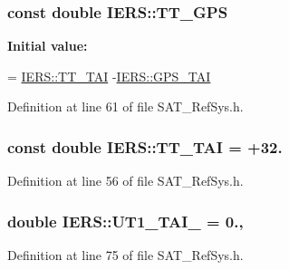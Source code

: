 \hypertarget{classIERS_aa3e35ab4212b649feeaf61764d85c690}{
\subsubsection[{T\-T\-\_\-\-G\-P\-S}]{\setlength{\rightskip}{0pt plus 5cm}const double I\-E\-R\-S\-::\-T\-T\-\_\-\-G\-P\-S\hspace{0.3cm}{\ttfamily [static]}}}\label{classIERS_aa3e35ab4212b649feeaf61764d85c690}
{\bfseries Initial value\-:}
\begin{DoxyCode}
=  \hyperlink{classIERS_ab6b095690199dc9789b668eafe93423e}{IERS::TT\_TAI}     
                             -\hyperlink{classIERS_a6289aefd6f6c45e58d7d9ce2e3789c64}{IERS::GPS\_TAI}
\end{DoxyCode}


Definition at line 61 of file S\-A\-T\-\_\-\-Ref\-Sys.\-h.

\hypertarget{classIERS_ab6b095690199dc9789b668eafe93423e}{
\subsubsection[{T\-T\-\_\-\-T\-A\-I}]{\setlength{\rightskip}{0pt plus 5cm}const double I\-E\-R\-S\-::\-T\-T\-\_\-\-T\-A\-I = +32.\hspace{0.3cm}{\ttfamily [static]}}}\label{classIERS_ab6b095690199dc9789b668eafe93423e}


Definition at line 56 of file S\-A\-T\-\_\-\-Ref\-Sys.\-h.

\hypertarget{classIERS_a75a822b27f30fc3369697819de08da84}{
\subsubsection[{U\-T1\-\_\-\-T\-A\-I\-\_\-}]{\setlength{\rightskip}{0pt plus 5cm}double I\-E\-R\-S\-::\-U\-T1\-\_\-\-T\-A\-I\-\_\- = 0.\hspace{0.3cm}{\ttfamily [static]}, {\ttfamily [private]}}}\label{classIERS_a75a822b27f30fc3369697819de08da84}


Definition at line 75 of file S\-A\-T\-\_\-\-Ref\-Sys.\-h.


